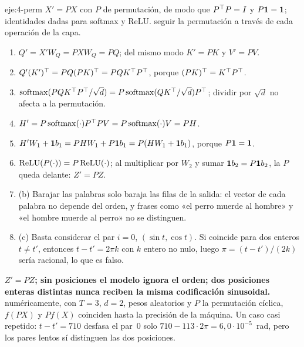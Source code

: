 \begin{solucion}{eje:4-perm}
\datos $X'=PX$ con $P$ de permutación, de modo que $P^{\top} P=I$ y $P\mathbf{1}=\mathbf{1}$; identidades dadas para softmax y ReLU.
\planteamiento seguir la permutación a través de cada operación de la capa.
\pasos
\begin{enumerate}[label=\arabic*.]
  \item $Q'=X'W_Q=PXW_Q=PQ$; del mismo modo $K'=PK$ y $V'=PV$.
  \item $Q'(K')^{\top}=PQ(PK)^{\top}=PQK^{\top} P^{\top}$, porque $(PK)^{\top}=K^{\top} P^{\top}$.
  \item $\operatorname{softmax}(PQK^{\top} P^{\top}/\sqrt d)=P\operatorname{softmax}(QK^{\top}/\sqrt d)P^{\top}$; dividir por $\sqrt d$ no afecta a la permutación.
  \item $H'=P\operatorname{softmax}(\cdot)P^{\top} PV=P\operatorname{softmax}(\cdot)V=PH$.
  \item $H'W_1+\mathbf{1} b_1=PHW_1+P\mathbf{1} b_1=P(HW_1+\mathbf{1} b_1)$, porque $P\mathbf{1}=\mathbf{1}$.
  \item $\operatorname{ReLU}(P(\cdot))=P\operatorname{ReLU}(\cdot)$; al multiplicar por $W_2$ y sumar $\mathbf{1} b_2=P\mathbf{1} b_2$, la $P$ queda delante: $Z'=PZ$.
  \item (b) Barajar las palabras solo baraja las filas de la salida: el vector de cada palabra no depende del orden, y frases como «el perro muerde al hombre» y «el hombre muerde al perro» no se distinguen.
  \item (c) Basta considerar el par $i=0$, $(\sin t,\cos t)$. Si coincide para dos enteros $t\ne t'$, entonces $t-t'=2\pi k$ con $k$ entero no nulo, luego $\pi=(t-t')/(2k)$ sería racional, lo que es falso.
\end{enumerate}
\resultado \textbf{$Z'=PZ$; sin posiciones el modelo ignora el orden; dos posiciones enteras distintas nunca reciben la misma codificación sinusoidal.}
\comprobacion numéricamente, con $T=3$, $d=2$, pesos aleatorios y $P$ la permutación cíclica, $f(PX)$ y $Pf(X)$ coinciden hasta la precisión de la máquina. Un caso casi repetido: $t-t'=710$ desfasa el par~0 solo $710-113\cdot 2\pi=6{,}0\cdot 10^{-5}$~rad, pero los pares lentos sí distinguen las dos posiciones.
\end{solucion}

